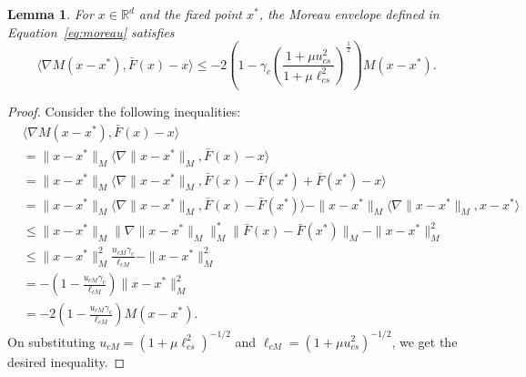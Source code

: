 \documentclass{article}
\newcommand{\lrp}[1]{\left( #1 \right)}
\newcommand{\R}{\mathbb{R}}
\newcommand{\lcm}{\ell_{cM}}
\newcommand{\ucm}{u_{cM}}
\newcommand{\lcs}{\ell_{cs}}
\newcommand{\ucs}{u_{cs}}
\newtheorem{lemma}[theorem]{Lemma}
\begin{document}
\begin{lemma}\label{lem:negdriftofMoreau}
    For $x\in\R^d$ and the fixed point $x^*$, the Moreau envelope defined in Equation~\eqref{eq:moreau} satisfies 
    \[ \langle \nabla M(x-x^*), \bar{F}(x) - x \rangle \le - 2 \lrp{ 1 -  \gamma_c\lrp{\frac{1 + \mu \ucs^2 }{1 + \mu \lcs^2}}^\frac{1}{2}} M(x - x^*). \]
\end{lemma}
\begin{proof}
    Consider the following inequalities:
    \begin{align*}
        & \langle \nabla M(x-x^*) , \bar{F}(x) - x \rangle \\
        &= \|x-x^*\|_M \langle \nabla \|x-x^*\|_M, \bar{F}(x) - x \rangle\\
        &= \|x-x^*\|_M \langle \nabla \|x-x^*\|_M, \bar{F}(x) - \bar{F}(x^*) + \bar{F}(x^*) - x \rangle\\
        &= \|x-x^*\|_M  \langle \nabla \|x-x^*\|_M, \bar{F}(x) - \bar{F}(x^*) \rangle - \|x-x^*\|_M  \langle \nabla \|x-x^*\|_M, x - x^* \rangle \\
        &\le \|x-x^*\|_M \| \nabla \|x-x^*\|_M \|^*_M \|\bar{F}(x) - \bar{F}(x^*)\|_M - \|x-x^*\|^2_M  \tag{Cauchy-Schwarz and Convexity of $\|\cdot\|_M$} \\
        &\le \|x-x^*\|^2_M \frac{\ucm\gamma_c}{\lcm} - \|x-x^*\|^2_M \tag{$\| \nabla \|\cdot\|_M \|^*_M \le 1$} \\
        &= - \lrp{1-\frac{\ucm \gamma_c}{\lcm}} \|x-x^*\|^2_M \\
        &= - 2\lrp{1-\frac{\ucm \gamma_c}{\lcm}} M(x-x^*).
    \end{align*}
    On substituting $\ucm = (1+\mu\lcs^2)^{-1/2}$ and $\lcm = (1+ \mu \ucs^2)^{-1/2}$, we get the desired inequality.
\end{proof}
\end{document}
